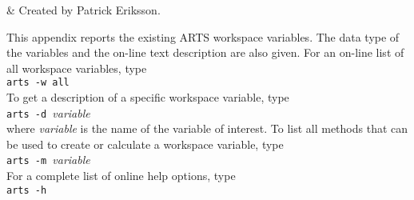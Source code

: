  \label{app:wsv}


 & Created by Patrick Eriksson. \\
\stophistory

 This appendix reports the existing ARTS workspace variables. The
 data type of the variables and the on-line text description are also
 given. For an on-line list of all workspace variables, type\\

 \verb|arts -w all| \\

 \noindent
 To get a description of a specific workspace variable, type\\

 \verb|arts -d |{\it variable} \\

 \noindent
 where {\it variable} is the name of the variable of interest. To list
 all methods that can be used to create or calculate a workspace variable,
 type \\

 \verb|arts -m |{\it variable} \\

 \noindent
 For a complete list of online help options, type\\ 

 \verb|arts -h| \\
 
 {\footnotesize
  }




